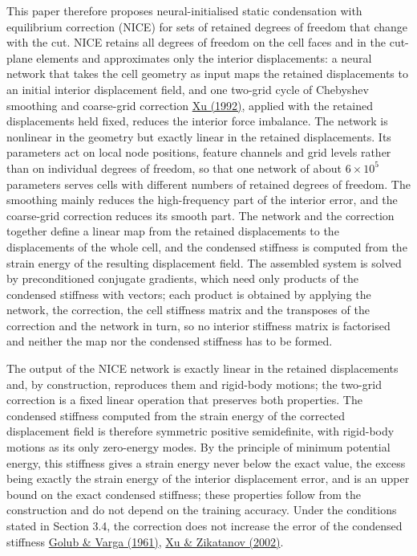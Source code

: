 \documentclass[preprint,12pt,authoryear]{elsarticle}
\begin{document}
This paper therefore proposes neural-initialised static condensation with equilibrium correction (NICE) for sets of retained degrees of freedom that change with the cut. NICE retains all degrees of freedom on the cell faces and in the cut-plane elements and approximates only the interior displacements: a neural network that takes the cell geometry as input maps the retained displacements to an initial interior displacement field, and one two-grid cycle of Chebyshev smoothing and coarse-grid correction \href{https://doi.org/10.1137/1034116}{Xu (1992)}, applied with the retained displacements held fixed, reduces the interior force imbalance. The network is nonlinear in the geometry but exactly linear in the retained displacements. Its parameters act on local node positions, feature channels and grid levels rather than on individual degrees of freedom, so that one network of about \(6\times10^5\) parameters serves cells with different numbers of retained degrees of freedom. The smoothing mainly reduces the high-frequency part of the interior error, and the coarse-grid correction reduces its smooth part. The network and the correction together define a linear map from the retained displacements to the displacements of the whole cell, and the condensed stiffness is computed from the strain energy of the resulting displacement field. The assembled system is solved by preconditioned conjugate gradients, which need only products of the condensed stiffness with vectors; each product is obtained by applying the network, the correction, the cell stiffness matrix and the transposes of the correction and the network in turn, so no interior stiffness matrix is factorised and neither the map nor the condensed stiffness has to be formed.

The output of the NICE network is exactly linear in the retained displacements and, by construction, reproduces them and rigid-body motions; the two-grid correction is a fixed linear operation that preserves both properties. The condensed stiffness computed from the strain energy of the corrected displacement field is therefore symmetric positive semidefinite, with rigid-body motions as its only zero-energy modes. By the principle of minimum potential energy, this stiffness gives a strain energy never below the exact value, the excess being exactly the strain energy of the interior displacement error, and is an upper bound on the exact condensed stiffness; these properties follow from the construction and do not depend on the training accuracy. Under the conditions stated in Section 3.4, the correction does not increase the error of the condensed stiffness \href{https://doi.org/10.1007/BF01386013}{Golub \& Varga (1961)}, \href{https://doi.org/10.1090/S0894-0347-02-00398-3}{Xu \& Zikatanov (2002)}.
\end{document}
